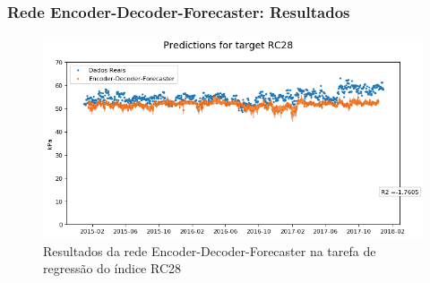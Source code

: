 \documentclass{beamer}
\begin{document}
\begin{frame}
\frametitle{Rede Encoder-Decoder-Forecaster: Resultados}  
\begin{figure}[H]
\centering
\includegraphics[width=0.9\columnwidth]{exped_saco_2008-2015-2017encdecRC28.png}
\caption{Resultados da rede Encoder-Decoder-Forecaster na tarefa de regressão do índice RC28}
\label{fig:3nseq}
\end{figure}
\end{frame}

\begin{frame}
\end{frame}
\end{document}
